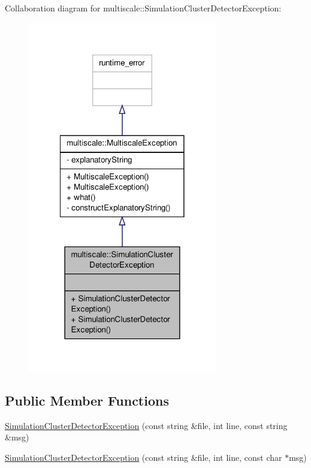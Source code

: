 Collaboration diagram for multiscale\-:\-:Simulation\-Cluster\-Detector\-Exception\-:
\nopagebreak
\begin{figure}[H]
\begin{center}
\leavevmode
\includegraphics[width=234pt]{classmultiscale_1_1SimulationClusterDetectorException__coll__graph}
\end{center}
\end{figure}
\subsection*{Public Member Functions}
\begin{DoxyCompactItemize}
\item 
\hyperlink{classmultiscale_1_1SimulationClusterDetectorException_ae0d5aea7a78e36a895473e6114eae158}{Simulation\-Cluster\-Detector\-Exception} (const string \&file, int line, const string \&msg)
\item 
\hyperlink{classmultiscale_1_1SimulationClusterDetectorException_afe51ca741acdf668b7334d885123878c}{Simulation\-Cluster\-Detector\-Exception} (const string \&file, int line, const char $\ast$msg)
\end{DoxyCompactItemize}


